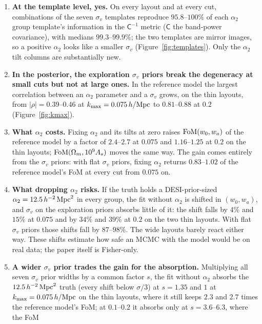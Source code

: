\documentclass[11pt]{article}
\newcommand{\Cov}{\mathsf{C}}
\newcommand{\kmax}{k_{\rm max}}
\newcommand{\hMpc}{\,h/{\rm Mpc}}
\newcommand{\aunit}{\,h^{-2}\,{\rm Mpc}^2}
\newcommand{\sv}{\sigma_v}
\begin{document}
\begin{enumerate}
  \item \textbf{At the template level, yes.}  On every layout and at
    every cut, combinations of the seven $\sv$ templates reproduce
    $95.8$--$100\%$ of each $\alpha_2$ group template's information in
    the $\Cov^{-1}$ metric ($\Cov$ the band-power covariance), with
    medians $99.3$--$99.9\%$; the two templates are mirror images, so
    a positive $\alpha_2$ looks like a smaller $\sv$
    (Figure~\ref{fig:templates}).  Only the $\alpha_2$ tilt columns
    are substantially new.
  \item \textbf{In the posterior, the exploration $\sv$ priors break
    the degeneracy at small cuts but not at large ones.}  In the
    reference model the largest correlation between an $\alpha_2$
    parameter and a $\sv$ grows, on the thin layouts, from
    $|\rho| = 0.39$--$0.46$ at $\kmax = 0.075\hMpc$ to $0.81$--$0.88$
    at $0.2$ (Figure~\ref{fig:kmax}).
  \item \textbf{What $\alpha_2$ costs.}  Fixing $\alpha_2$ and its
    tilts at zero raises ${\rm FoM}(w_0, w_a)$ of the reference model
    by a factor of $2.4$--$2.7$ at $0.075$ and $1.16$--$1.25$ at
    $0.2$ on the thin layouts; ${\rm FoM}(\Omega_m, 10^9 A_s)$ moves
    the same way.  The gain comes entirely from the $\sv$ priors:
    with flat $\sv$ priors, fixing $\alpha_2$ returns $0.83$--$1.02$
    of the reference model's FoM at every cut from $0.075$ on.
  \item \textbf{What dropping $\alpha_2$ risks.}  If the truth holds
    a DESI-prior-sized $\alpha_2 = 12.5\aunit$ in every group, the
    fit without $\alpha_2$ is shifted in $(w_0, w_a)$, and $\sv$ on
    the exploration priors absorbs little of it: the shift falls by
    $4\%$ and $15\%$ at $0.075$ and by $34\%$ and $39\%$ at $0.2$ on
    the two thin layouts.  With flat $\sv$ priors those shifts fall
    by $87$--$98\%$.  The wide layouts barely react either way.
    These shifts estimate how safe an MCMC with the model would be on
    real data; the paper itself is Fisher-only.
  \item \textbf{A wider $\sv$ prior trades the gain for the
    absorption.}  Multiplying all seven $\sv$ prior widths by a
    common factor $s$, the fit without $\alpha_2$ absorbs the
    $12.5\aunit$ truth (every shift below $\sigma/3$) at $s = 1.35$
    and $1$ at $\kmax = 0.075\hMpc$ on the thin layouts, where it
    still keeps $2.3$ and $2.7$ times the reference model's FoM; at
    $0.1$--$0.2$ it absorbs only at $s = 3.6$--$6.3$, where the FoM

\end{enumerate}
\end{document}
